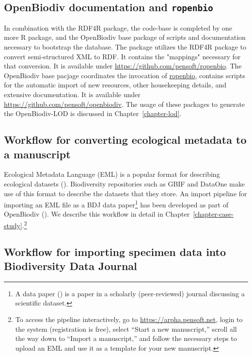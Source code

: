 \subsection{OpenBiodiv documentation and {\tt ropenbio}}

In combination with the RDF4R package, the code-base is completed by one more R package,  and the OpenBiodiv base package of scripts and documentation necessary to bootstrap the database. The package  utilizes the RDF4R package to convert semi-structured XML to RDF. It contains the "mappings" necessary for that conversion. It is available under \url{https://github.com/pensoft/ropenbio}. The OpenBiodiv base pacjage coordinates the invocation of \url{ropenbio}, contains scripts for the automatic import of new resources, other housekeeping details, and extensive documentation. It is available under \url{https://github.com/pensoft/openbiodiv}. The usage of these packages to generate the OpenBiodiv-LOD is discussed in Chapter~\ref{chapter-lod}.

\subsection{Workflow for converting ecological metadata to a manuscript}  

Ecological Metadata Language (EML) is a popular format for describing ecological datasets (\cite{michener_nongeospatial_1997}). Biodiversity repositories such as GBIF and DataOne make use of this format to describe the datasets that they store. An import pipeline for importing an EML file as a BDJ data paper\footnote{A data paper (\cite{chavan_data_2011}) is a paper in a scholarly (peer-reviewed) journal discussing a scientific dataset.} has been developed as part of OpenBiodiv (\cite{senderov_online_2016}). We describe this workflow in detail in Chapter~\ref{chapter-case-study}.\footnote{To access the pipeline interactively, go to \url{https://arpha.pensoft.net}, login to the system (registration is free), select ``Start a new manuscript,'' scroll all the way down to ``Import a manuscript,'' and follow the necessary steps to upload an EML and use it as a template for your new manuscript.}

\subsection{Workflow for importing specimen data into Biodiversity Data Journal}

